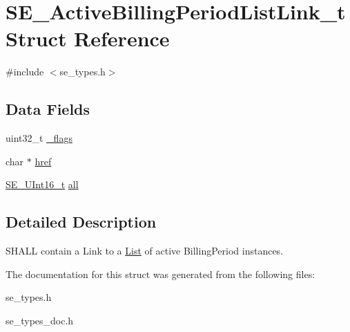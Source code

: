 \hypertarget{structSE__ActiveBillingPeriodListLink__t}{}\section{S\+E\+\_\+\+Active\+Billing\+Period\+List\+Link\+\_\+t Struct Reference}
\label{structSE__ActiveBillingPeriodListLink__t}


{\ttfamily \#include $<$se\+\_\+types.\+h$>$}

\subsection*{Data Fields}
\begin{DoxyCompactItemize}
\item 
uint32\+\_\+t \hyperlink{group__ActiveBillingPeriodListLink_ga64ef5582fc32d3a39dfe9dd7240bbd71}{\+\_\+flags}
\item 
char $\ast$ \hyperlink{group__ActiveBillingPeriodListLink_gadfabe0fe21a2310a4503768001c896ca}{href}
\item 
\hyperlink{group__UInt16_gac68d541f189538bfd30cfaa712d20d29}{S\+E\+\_\+\+U\+Int16\+\_\+t} \hyperlink{group__ActiveBillingPeriodListLink_ga8bc21221a3c43c55939ec4201a003500}{all}
\end{DoxyCompactItemize}


\subsection{Detailed Description}
S\+H\+A\+LL contain a Link to a \hyperlink{structList}{List} of active Billing\+Period instances. 

The documentation for this struct was generated from the following files\+:\begin{DoxyCompactItemize}
\item 
se\+\_\+types.\+h\item 
se\+\_\+types\+\_\+doc.\+h\end{DoxyCompactItemize}

